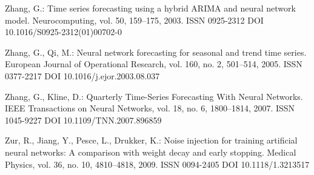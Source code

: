 \begin{thebibliography}{99.}
 Zhang, G.: Time series forecasting using a hybrid ARIMA and neural network model. Neurocomputing, vol. 50, 159--175, 2003. ISSN 0925-2312 DOI 10.1016/S0925-2312(01)00702-0

 Zhang, G., Qi, M.: Neural network forecasting for seasonal and trend time series. European Journal of Operational Research, vol. 160, no. 2, 501--514, 2005. ISSN 0377-2217 DOI 10.1016/j.ejor.2003.08.037

 Zhang, G., Kline, D.: Quarterly Time-Series Forecasting With Neural Networks. IEEE Transactions on Neural Networks, vol. 18, no. 6, 1800--1814, 2007. ISSN 1045-9227 DOI 10.1109/TNN.2007.896859

 Zur, R., Jiang, Y., Pesce, L., Drukker, K.: Noise injection for training artificial neural networks: A comparison with weight decay and early stopping. Medical Physics, vol. 36, no. 10, 4810--4818, 2009. ISSN 0094-2405 DOI 10.1118/1.3213517

\end{thebibliography}
